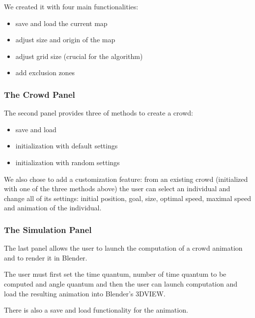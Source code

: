 We created it with four main functionalities:
\begin{itemize}
\item save and load the current map
\item adjust size and origin of the map
\item adjust grid size (crucial for the algorithm)
\item add exclusion zones
\end{itemize}


\subsubsection{The Crowd Panel} 

The second panel provides three of methods to create a crowd:
\begin{itemize}
\item save and load
\item initialization with default settings
\item initialization with random settings
\end{itemize}

We also chose to add a customization feature: from an existing crowd
(initialized with one of the three methods above) the user can select
an individual and change all of its settings: initial position, goal,
size, optimal speed, maximal speed and animation of the individual.


\subsubsection{The Simulation Panel} 

The last panel allows the user to launch the computation of a crowd
animation and to render it in Blender.

The user must first set the time quantum, number of time quantum to be
computed and angle quantum and then the user can launch
computation and load the resulting animation into Blender's 3DVIEW.


There is also a save and load functionality for the animation.

